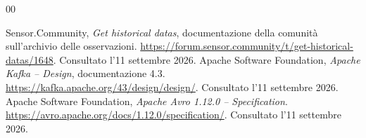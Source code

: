 \begin{thebibliography}{00}

Sensor.Community, \emph{Get historical datas}, documentazione della comunità
sull'archivio delle osservazioni.
\url{https://forum.sensor.community/t/get-historical-datas/1648}.
Consultato l'11 settembre 2026.
Apache Software Foundation, \emph{Apache Kafka -- Design}, documentazione 4.3.
\url{https://kafka.apache.org/43/design/design/}.
Consultato l'11 settembre 2026.
Apache Software Foundation, \emph{Apache Avro 1.12.0 -- Specification}.
\url{https://avro.apache.org/docs/1.12.0/specification/}.
Consultato l'11 settembre 2026.
\end{thebibliography}
